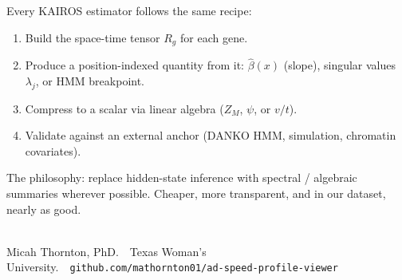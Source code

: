 \documentclass[11pt]{article}
\begin{document}
Every KAIROS estimator follows the same recipe:

\begin{enumerate}[leftmargin=1.4em,itemsep=0.1em]
  \item Build the space-time tensor $R_g$ for each gene.
  \item Produce a position-indexed quantity from it: $\widehat\beta(x)$
        (slope), singular values $\lambda_j$, or HMM breakpoint.
  \item Compress to a scalar via linear algebra ($Z_M$, $\psi$, or $v/t$).
  \item Validate against an external anchor (DANKO HMM, simulation,
        chromatin covariates).
\end{enumerate}

The philosophy: replace hidden-state inference with spectral / algebraic
summaries wherever possible. Cheaper, more transparent, and in our
dataset, nearly as good.

\vfill
\noindent{\color{KRule}\rule{\textwidth}{0.4pt}}\\
{\color{KRule}\small Micah Thornton, PhD.\ \ Texas Woman's University.\ \
\texttt{github.com/mathornton01/ad-speed-profile-viewer}}
\end{document}
